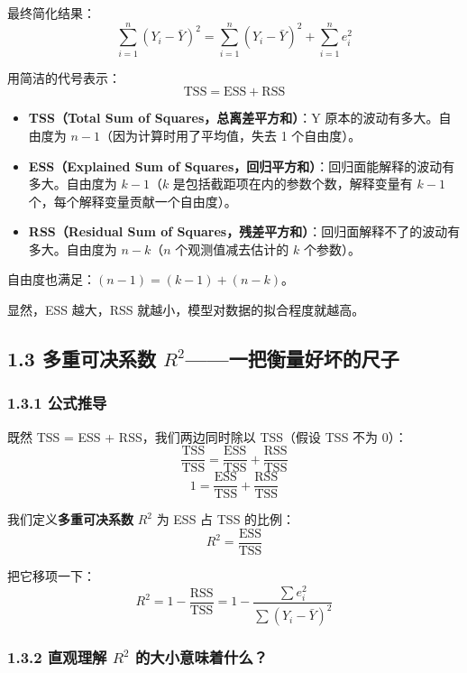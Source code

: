 \documentclass[12pt,a4paper]{ctexart}
\begin{document}
最终简化结果：
\begin{equation}
\sum_{i=1}^{n}(Y_i - \bar{Y})^2 = \sum_{i=1}^{n}(\hat{Y}_i - \bar{Y})^2 + \sum_{i=1}^{n} e_i^2 \tag{3.38}
\end{equation}

用简洁的代号表示：
\[
\text{TSS} = \text{ESS} + \text{RSS}
\]
\begin{itemize}
    \item \textbf{TSS（Total Sum of Squares，总离差平方和）}：Y 原本的波动有多大。自由度为 \(n-1\)（因为计算时用了平均值，失去 1 个自由度）。
    \item \textbf{ESS（Explained Sum of Squares，回归平方和）}：回归面能解释的波动有多大。自由度为 \(k-1\)（\(k\) 是包括截距项在内的参数个数，解释变量有 \(k-1\) 个，每个解释变量贡献一个自由度）。
    \item \textbf{RSS（Residual Sum of Squares，残差平方和）}：回归面解释不了的波动有多大。自由度为 \(n-k\)（\(n\) 个观测值减去估计的 \(k\) 个参数）。
\end{itemize}

自由度也满足：\((n-1) = (k-1) + (n-k)\)。

显然，ESS 越大，RSS 就越小，模型对数据的拟合程度就越高。

\subsection{1.3 多重可决系数 \(R^2\)——一把衡量好坏的尺子}

\subsubsection{1.3.1 公式推导}

既然 TSS = ESS + RSS，我们两边同时除以 TSS（假设 TSS 不为 0）：
\[
\frac{\text{TSS}}{\text{TSS}} = \frac{\text{ESS}}{\text{TSS}} + \frac{\text{RSS}}{\text{TSS}}
\]
\[
1 = \frac{\text{ESS}}{\text{TSS}} + \frac{\text{RSS}}{\text{TSS}}
\]

我们定义\textbf{多重可决系数} \(R^2\) 为 ESS 占 TSS 的比例：
\begin{equation}
R^2 = \frac{\text{ESS}}{\text{TSS}} \tag{3.39}
\end{equation}

把它移项一下：
\begin{equation}
R^2 = 1 - \frac{\text{RSS}}{\text{TSS}} = 1 - \frac{\sum e_i^2}{\sum(Y_i - \bar{Y})^2} \tag{3.40}
\end{equation}

\subsubsection{1.3.2 直观理解 \(R^2\) 的大小意味着什么？}
\end{document}
